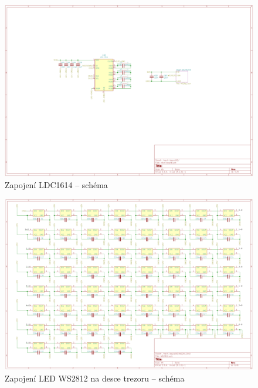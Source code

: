 \begin{figure}[htbp]
    \centering
    \includegraphics[width=0.93\textheight, angle=90]{kapitoly/ctvrta_elektronicka_varianta/E4_zapojeni/next_board.pdf}
    \caption{Zapojení LDC1614 -- schéma}
    \label{fig:E4-sch_next-board}
\end{figure}
\begin{figure}[htbp]
    \centering
    \includegraphics[width=0.93\textheight, angle=90]{kapitoly/ctvrta_elektronicka_varianta/E4_zapojeni/WS2812.pdf}
    \caption{Zapojení LED WS2812 na desce trezoru -- schéma}
    \label{fig:E4-sch_WS2812}
\end{figure}